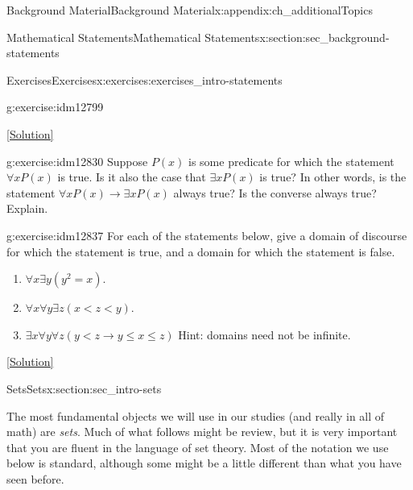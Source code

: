 \documentclass[oneside,10pt,]{book}
\numberwithin{equation}{chapter}
\def\imp{\rightarrow}
\newcommand{\lt}{<}
\begin{document}
\begin{appendixptx}{Background Material}{}{Background Material}{}{}{x:appendix:ch_additionalTopics}
\begin{sectionptx}{Mathematical Statements}{}{Mathematical Statements}{}{}{x:section:sec_background-statements}
\begin{exercises-subsection}{Exercises}{}{Exercises}{}{}{x:exercises:exercises_intro-statements}
\begin{divisionexercise}{8}{}{}{g:exercise:idm12799}
\begin{enumerate}[label=(\alph*)]
\end{enumerate}
%
\space\hspace*{0pt}\hfill{\tiny\hyperlink{g:solution:idm12811-main}{[Solution]}}\end{divisionexercise}%
\begin{divisionexercise}{9}{}{}{g:exercise:idm12830}%
Suppose \(P(x)\) is some predicate for which the statement \(\forall x P(x)\) is true. Is it also the case that \(\exists x P(x)\) is true? In other words, is the statement \(\forall x P(x) \imp \exists x P(x)\) always true? Is the converse always true? Explain.%
\end{divisionexercise}%
\begin{divisionexercise}{10}{}{}{g:exercise:idm12837}%
For each of the statements below, give a domain of discourse for which the statement is true, and a domain for which the statement is false.%
\par
%
\begin{enumerate}[label=(\alph*)]
\item{}\(\forall x \exists y (y^2 = x)\).%
\item{}\(\forall x \forall y \exists z (x \lt  z \lt  y)\).%
\item{}\(\exists x \forall y \forall z (y \lt  z \imp y \le x \le z)\) Hint: domains need not be infinite.%
\end{enumerate}
%
\space\hspace*{0pt}\hfill{\tiny\hyperlink{g:solution:idm12848-main}{[Solution]}}\end{divisionexercise}%
\end{exercises-subsection}
\end{sectionptx}
%
%
\typeout{************************************************}
\typeout{************************************************}
%
\begin{sectionptx}{Sets}{}{Sets}{}{}{x:section:sec_intro-sets}
\begin{introduction}{}%
The most fundamental objects we will use in our studies (and really in all of math) are \emph{sets}. Much of what follows might be review, but it is very important that you are fluent in the language of set theory. Most of the notation we use below is standard, although some might be a little different than what you have seen before.%
\par

\end{introduction}
\end{sectionptx}
\end{appendixptx}
\end{document}
